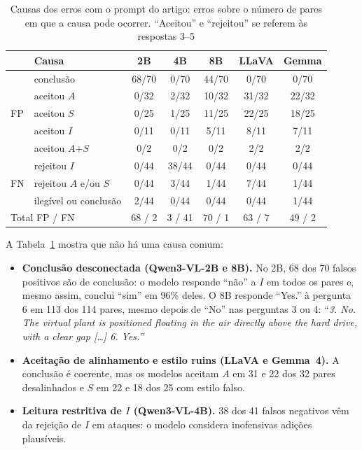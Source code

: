 \documentclass[conference]{IEEEtran}
\begin{document}
\begin{table}[!t]
\renewcommand{\arraystretch}{1.05}
\caption{Causas dos erros com o prompt do artigo: erros sobre o número de pares em que a causa pode
ocorrer. ``Aceitou'' e ``rejeitou'' se referem às respostas 3--5}
\label{tab:causas}
\centering
\footnotesize
\setlength{\tabcolsep}{2.6pt}
\begin{tabular}{llccccc}
\toprule
 & Causa & 2B & 4B & 8B & LLaVA & Gemma \\
\midrule
\multirow{5}{*}{FP} & conclusão & 68/70 & 0/70 & 44/70 & 0/70 & 0/70 \\
 & aceitou $A$ & 0/32 & 2/32 & 10/32 & 31/32 & 22/32 \\
 & aceitou $S$ & 0/25 & 1/25 & 11/25 & 22/25 & 18/25 \\
 & aceitou $I$ & 0/11 & 0/11 & 5/11 & 8/11 & 7/11 \\
 & aceitou $A$+$S$ & 0/2 & 0/2 & 0/2 & 2/2 & 2/2 \\
\midrule
\multirow{3}{*}{FN} & rejeitou $I$ & 0/44 & 38/44 & 0/44 & 0/44 & 0/44 \\
 & rejeitou $A$ e/ou $S$ & 0/44 & 3/44 & 1/44 & 7/44 & 1/44 \\
 & ilegível ou conclusão & 2/44 & 0/44 & 0/44 & 0/44 & 1/44 \\
\midrule
\multicolumn{2}{l}{Total FP / FN} & 68 / 2 & 3 / 41 & 70 / 1 & 63 / 7 & 49 / 2 \\
\bottomrule
\end{tabular}
\end{table}

A Tabela~\ref{tab:causas} mostra que não há uma causa comum:
\begin{itemize}
\item \textbf{Conclusão desconectada (Qwen3-VL-2B e 8B).} No 2B, 68 dos 70 falsos positivos são de
  conclusão: o modelo responde ``não'' a $I$ em todos os pares e, mesmo assim, conclui ``sim'' em 96\%
  deles. O 8B responde ``Yes.'' à pergunta 6 em 113 dos 114 pares, mesmo depois de ``No'' nas perguntas 3
  ou 4: ``\emph{3. No. The virtual plant is positioned floating in the air directly above the hard drive,
  with a clear gap [\dots] 6. Yes.}''
\item \textbf{Aceitação de alinhamento e estilo ruins (LLaVA e Gemma~4).} A conclusão é coerente, mas os
  modelos aceitam $A$ em 31 e 22 dos 32 pares desalinhados e $S$ em 22 e 18 dos 25 com estilo falso.
\item \textbf{Leitura restritiva de $I$ (Qwen3-VL-4B).} 38 dos 41 falsos negativos vêm da rejeição de $I$
  em ataques: o modelo considera inofensivas adições plausíveis.
\end{itemize}
\end{document}

